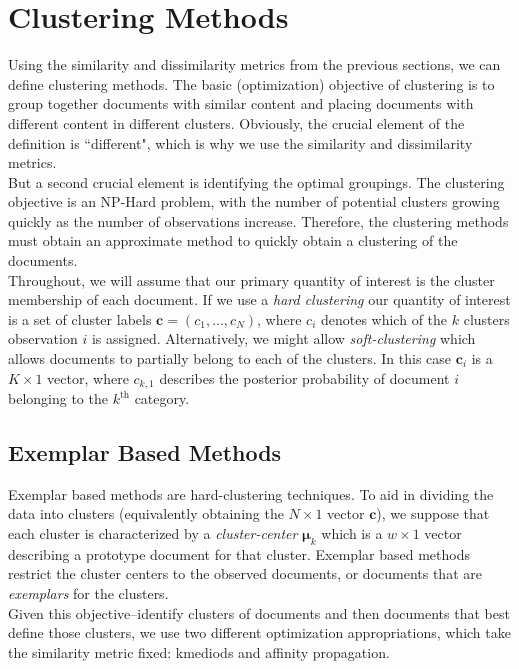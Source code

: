 \documentclass[11pt,letterpaper]{article}
\numberwithin{equation}{section}
\begin{document}
\section{Clustering Methods}
Using the similarity and dissimilarity metrics from the previous
sections, we can define clustering methods.  The basic
(optimization) objective of clustering is to group together
documents with similar content and placing documents with different
content in different clusters.  Obviously, the crucial element of
the definition is ``different", which is why we use the similarity
and dissimilarity metrics.  \\
\indent But a second crucial element is identifying the optimal
groupings.  The clustering objective is an NP-Hard problem, with the
number of potential clusters growing quickly as the number of
observations increase.  Therefore, the clustering methods must
obtain an approximate method to quickly obtain a clustering of the
documents. \\
\indent Throughout, we will assume that our primary quantity of
interest is the cluster membership of each document.  If we use a
\emph{hard clustering} our quantity of interest is a set of cluster
labels $\boldsymbol{c} = (c_1, \hdots, c_N)$, where $c_i$ denotes
which of the $k$ clusters observation $i$ is assigned.
Alternatively, we might allow \emph{soft-clustering} which allows
documents to partially belong to each of the clusters.  In this case
$\boldsymbol{c}_i$ is a $K \times 1$ vector, where $c_{k,1}$
describes the posterior probability of document $i$ belonging to the
$k^{\text{th}}$ category.
\subsection{Exemplar Based Methods}
Exemplar based methods are hard-clustering techniques.  To aid in
dividing the data into clusters (equivalently obtaining the $N
\times 1$ vector $\boldsymbol{c}$), we suppose that each cluster is
characterized by a \emph{cluster-center} $\boldsymbol{\mu}_k$ which
is a $w \times 1$ vector describing a prototype document for that
cluster. Exemplar based methods restrict the cluster centers to the
observed documents, or documents that are \emph{exemplars} for the
clusters.  \\
\indent Given this objective--identify clusters of documents and
then documents that best define those clusters, we use two different
optimization appropriations, which take the similarity metric fixed:
kmediods and affinity propagation.
\end{document}
